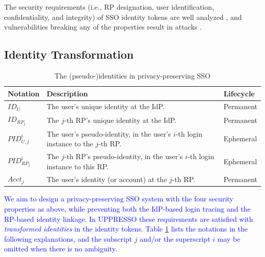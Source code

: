 The security requirements (i.e., RP designation, user identification, confidentiality, and integrity) of SSO identity tokens
     are well analyzed \cite{ArmandoCCCT08,FettKS16, FettKS17},
     and
     vulnerabilities breaking any of the properties
            result in attacks \cite{SomorovskyMSKJ12, WangCW12, ArmandoCCCPS13, ZhouE14, WangZLLYLG15, WangZLG16, YangLLZH16, MainkaMS16, MainkaMSW17, YangLCZ18, YangLS17, ShiWL19, ChenPCTKT14, ccsSunB12, DiscoveringJCS, dimvaLiM16, CaoSBKVC14, TowardsShehabM14}.


\subsection{Identity Transformation}
\label{subsec:solutions}

\begin{table}[t]
\footnotesize
    \caption{The (pseudo-)identities in privacy-preserving SSO}
    \centering
    \begin{tabular}{|p{1.0cm}|p{5.1cm}|p{1.13cm}|} \hline
    {\textbf{Notation}} & {\textbf{Description}} & {\textbf{Lifecycle}} \\ \hline
    {$ID_U$} & {The user's unique identity at the IdP.} & {Permanent} \\ \hline
    {$ID_{RP_j}$} & {The $j$-th RP's unique identity at the IdP.} & {Permanent} \\ \hline
    {$PID_{U,j}^i$} & {The user's pseudo-identity, in the user's $i$-th login instance to the $j$-th RP.} & {Ephemeral} \\ \hline
    {$PID_{RP_j}^i$} & {The $j$-th RP's pseudo-identity, in the user's $i$-th login instance to this RP.} & {Ephemeral} \\ \hline
    {$Acct_j$} & {The user's identity (or account) at the $j$-th RP.} & {Permanent} \\ \hline
    \end{tabular}
    \label{tbl:notations-dilemma}
\end{table}


\textcolor{blue}{We aim to design a privacy-preserving SSO system with the four security properties as above,
    while preventing both the IdP-based login tracing and the RP-based identity linkage.
In UPPRESSO these requirements are satisfied with \emph{transformed identities} in the identity tokens.
Table \ref{tbl:notations-dilemma} lists the notations in the following explanations,
    and the subscript $j$ and/or the superscript $i$ may be omitted when there is no ambiguity.}

